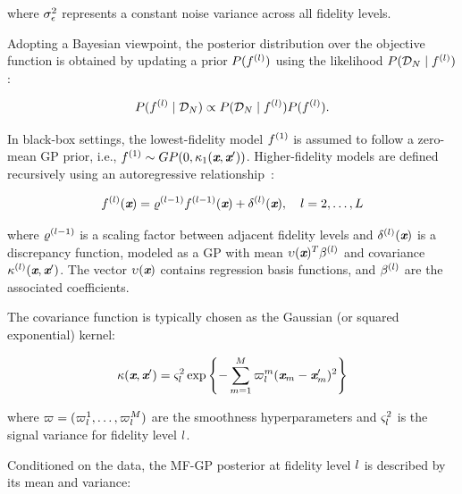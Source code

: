 \noindent where $\sigma_{\epsilon}^2$ represents a constant noise variance across all fidelity levels.

Adopting a Bayesian viewpoint, the posterior distribution over the objective function is obtained by updating a prior $P(f^{(l)})$ using the likelihood $P(\mathcal{D}_{N} \mid f^{(l)})$:

\[
	P( f^{(l)} \mid \mathcal{D}_{N}) \propto P(\mathcal{D}_{N} \mid f^{(l)}) P(f^{(l)}).
\]

In black-box settings, the lowest-fidelity model $f^{(1)}$ is assumed to follow a zero-mean GP prior, i.e., $f^{(1)} \sim GP(0, \kappa_1(\textbf{\em x}, \textbf{\em x}'))$. Higher-fidelity models are defined recursively using an autoregressive relationship~\cite{kennedy2000predicting}:

\begin{equation}\label{e:MFGP1}
	f^{(l)}(\textbf{\em x}) = \varrho^{(l-1)} f^{(l - 1)}(\textbf{\em x}) + \delta^{(l)}(\textbf{\em x}), \quad l = 2, \dots, L
\end{equation}

\noindent where $\varrho^{(l-1)}$ is a scaling factor between adjacent fidelity levels and $\delta^{(l)}(\textbf{\em x})$ is a discrepancy function, modeled as a GP with mean $\upsilon(\textbf{\em x})^T \beta^{(l)}$ and covariance $\kappa^{(l)}(\textbf{\em x}, \textbf{\em x}')$. The vector $\upsilon(\textbf{\em x})$ contains regression basis functions, and $\beta^{(l)}$ are the associated coefficients.

The covariance function is typically chosen as the Gaussian (or squared exponential) kernel:

\begin{equation} \label{eq:kernelfunc}
	\kappa(\textbf{\em x}, \textbf{\em x}') = \varsigma^2_{l} \exp \left\{ - \sum_{m=1}^{M} \varpi^m_{l} (\textbf{\em x}_m - \textbf{\em x}_m')^2 \right\}
\end{equation}

\noindent where $\varpi = (\varpi^1_{l}, \ldots, \varpi^M_{l})$ are the smoothness hyperparameters and $\varsigma^2_{l}$ is the signal variance for fidelity level $l$.

Conditioned on the data, the MF-GP posterior at fidelity level $l$ is described by its mean and variance:

